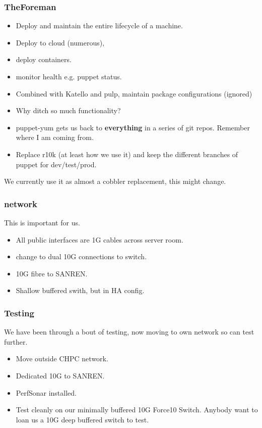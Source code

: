\documentclass{beamer}
\begin{document}
\begin{frame}
    \frametitle{TheForeman}
    \begin{itemize}
            \item Deploy and maintain the entire lifecycle of a machine.
            \item Deploy to cloud (numerous),
            \item deploy containers.
            \item monitor health e.g. puppet status.
            \item Combined with Katello and pulp, maintain package configurations (ignored)
            \item <2->Why ditch so much functionality? 
            \item <3->puppet-yum gets us back to {\color{red} {\bf everything}} in a series of git repos. Remember where I am coming from.
            \item <4->Replace r10k (at least how we use it) and keep the different branches of puppet for dev/test/prod.
    \end{itemize}
    We currently use it as almost a cobbler replacement, this might change.
\end{frame}

\begin{frame}
  \frametitle{network}
    This is \color{red}{critically} important for us.   
    \begin{itemize}
            \item All public interfaces are 1G cables across server room.
                \item change to dual 10G connections to switch.
                    \item 10G fibre to SANREN.
                        \item Shallow buffered swith, but in HA config.
    \end{itemize}
\end{frame}

\begin{frame}
    \frametitle{Testing}
    We have been through a bout of testing, now moving to own network so can test further.
    \begin{itemize}
            \item Move outside CHPC network.
    \item Dedicated 10G to SANREN.
    \item PerfSonar installed.
        \item Test cleanly on our minimally buffered 10G Force10 Switch. Anybody want to loan us a 10G deep buffered switch to test.
    \end{itemize}
    \end{frame}
\end{document}
